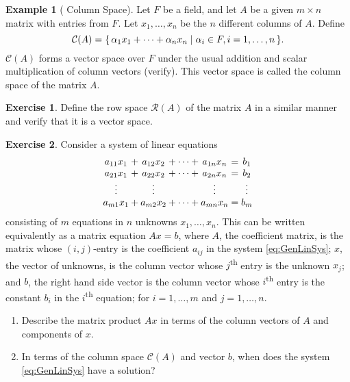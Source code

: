 \documentclass[svgnames]{article}
\theoremstyle{definition}
\newtheorem{Example}[Theorem]{Example}
\newtheorem{Exercise}{Exercise}[section]
\theoremstyle{remark}
\newcommand{\newterm}[1]{{\color{alertcolor} #1}}
\renewcommand{\th}{\textsuperscript{th}\xspace}
\begin{document}
\begin{Example}[\newterm{Column Space}]\label{ex:ColSpace}
Let $F$ be a field, and let $A$ be a given $m \times n$ matrix with entries from $F$. Let $x_1, \ldots, x_n$ be the $n$ different columns of $A$. Define
\begin{equation*}
	\mathcal C(A) = \qty{\, \alpha_1 x_1 + \cdots + \alpha_n x_n \mid \alpha_i \in F, i = 1, \ldots, n \,}.
\end{equation*}
$\mathcal C(A)$ forms a vector space over $F$ under the usual addition and scalar multiplication of column vectors (verify). This vector space is called the \newterm{column space} of the matrix $A$.
\end{Example}
\begin{Exercise}\label{exer:RowSpace}
Define the \newterm{row space} $\mathcal R(A)$ of the matrix $A$ in a similar manner and verify that it is a vector space.
\end{Exercise}

\begin{Exercise}
Consider a system of linear equations
\begin{align}
\begin{array}{@{}*{7}{c@{}}}
	a_{11} x_1 & {}+{} & a_{12} x_2 & {}+ \cdots +{} & a_{1n} x_n & {}={} & b_1\\
	a_{21} x_1 & {}+{} & a_{22} x_2 & {}+ \cdots +{} & a_{2n} x_n & {}={} & b_2\\
	\vdots     &       & \vdots     &                & \vdots     &       & \vdots\\
	a_{m1} x_1 & {}+{} & a_{m2} x_2 & {}+ \cdots +{} & a_{mn} x_n & {}={} & b_m
\end{array} \label{eq:GenLinSys}
\end{align}
consisting of $m$ equations in $n$ unknowns $x_1, \ldots, x_n$. This can be written equivalently as a matrix equation $Ax = b$, where $A$, the \newterm{coefficient matrix}, is the matrix whose $(i,j)$-entry is the coefficient $a_{ij}$ in the system \eqref{eq:GenLinSys}; $x$, the \newterm{vector of unknowns}, is the column vector whose $j$\th entry is the unknown $x_j$; and $b$, the \newterm{right hand side vector} is the column vector whose $i$\th entry is the constant $b_i$ in the $i$\th equation; for $i = 1, \ldots, m$ and $j = 1, \ldots, n$.
\begin{enumerate}
\item Describe the matrix product $Ax$ in terms of the column vectors of $A$ and components of $x$.
\item In terms of the column space $\mathcal{C}(A)$ and vector $b$, when does the system \eqref{eq:GenLinSys} have a solution?
\end{enumerate}
\end{Exercise}
\end{document}
